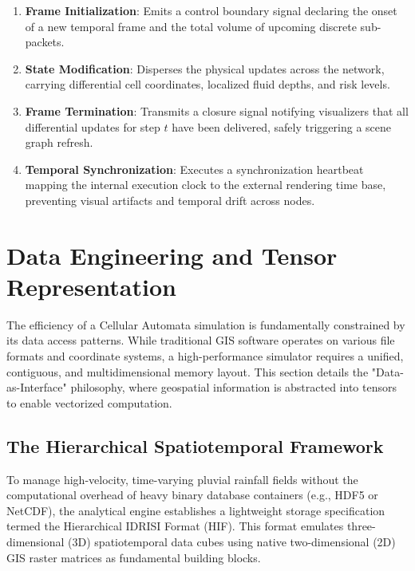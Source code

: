 \begin{enumerate}
    \item \textbf{Frame Initialization}: Emits a control boundary signal declaring the onset of a new temporal frame and the total volume of upcoming discrete sub-packets.
    
    \item \textbf{State Modification}: Disperses the physical updates across the network, carrying differential cell coordinates, localized fluid depths, and risk levels.
    
    \item \textbf{Frame Termination}: Transmits a closure signal notifying visualizers that all differential updates for step $t$ have been delivered, safely triggering a scene graph refresh.
    
    \item \textbf{Temporal Synchronization}: Executes a synchronization heartbeat mapping the internal execution clock to the external rendering time base, preventing visual artifacts and temporal drift across nodes.
\end{enumerate}


\section{Data Engineering and Tensor Representation}

The efficiency of a Cellular Automata simulation is fundamentally constrained by its data access patterns. While traditional GIS 
software operates on various file formats and coordinate systems, a high-performance simulator requires a unified, contiguous, and 
multidimensional memory layout. This section details the "Data-as-Interface" philosophy, where geospatial information is abstracted 
into tensors to enable vectorized computation.


\subsection{The Hierarchical Spatiotemporal Framework}
\label{subsec:hierarchical_spatiotemporal_framework}

To manage high-velocity, time-varying pluvial rainfall fields without the computational overhead of heavy binary database containers (e.g., HDF5 or NetCDF), the analytical engine establishes a lightweight storage specification termed the Hierarchical IDRISI Format (HIF). This format emulates three-dimensional (3D) spatiotemporal data cubes using native two-dimensional (2D) GIS raster matrices as fundamental building blocks.

